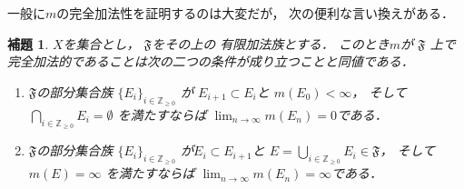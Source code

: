 \documentclass[leqno, a4paper, 12pt]{jsarticle}
\newtheorem{lem}[thm]{補題}
\newcommand{\zz}{\mathbb{Z}}
\begin{document}
一般に$m$の完全加法性を証明するのは大変だが，
次の便利な言い換えがある．
\begin{lem}\label{lem:douchi}
$X$を集合とし，
$\mathfrak{F}$をその上の
有限加法族とする．
このとき$m$が
$\mathfrak{F}$
上で完全加法的であることは次の二つの条件が成り立つことと同値である．
\begin{enumerate}
\item 
$\mathfrak{F}$の部分集合族
$\{E_{i}\}_{i\in \zz_{\ge 0}}$
が
$E_{i+1}\subset E_{i}$と
$m(E_{0})<\infty$，
そして
$\bigcap_{i\in \zz_{\ge 0}}E_{i}=\emptyset$
を満たすならば
$\lim_{n\to \infty}m(E_{n})=0$である．
\item 
$\mathfrak{F}$の部分集合族
$\{E_{i}\}_{i\in \zz_{\ge 0}}$
が$E_{i}\subset E_{i+1}$と
$E=\bigcup_{i\in \zz_{\ge 0}}E_{i}\in \mathfrak{F}$，
そして
$m(E)=\infty$
を満たすならば
$\lim_{n\to \infty}m(E_{n})=\infty$である．

\end{enumerate}
\end{lem}
\end{document}
